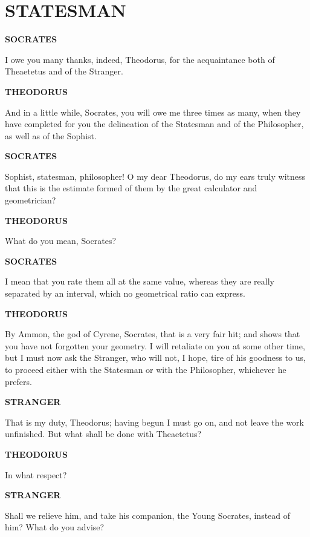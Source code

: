 \documentclass[11pt,letter]{article}
\begin{document}
\par 
\section{
      STATESMAN
    } 
\par \textbf{SOCRATES}
\par   I owe you many thanks, indeed, Theodorus, for the acquaintance both of Theaetetus and of the Stranger.

\par \textbf{THEODORUS}
\par   And in a little while, Socrates, you will owe me three times as many, when they have completed for you the delineation of the Statesman and of the Philosopher, as well as of the Sophist.

\par \textbf{SOCRATES}
\par   Sophist, statesman, philosopher! O my dear Theodorus, do my ears truly witness that this is the estimate formed of them by the great calculator and geometrician?

\par \textbf{THEODORUS}
\par   What do you mean, Socrates?

\par \textbf{SOCRATES}
\par   I mean that you rate them all at the same value, whereas they are really separated by an interval, which no geometrical ratio can express.

\par \textbf{THEODORUS}
\par   By Ammon, the god of Cyrene, Socrates, that is a very fair hit; and shows that you have not forgotten your geometry. I will retaliate on you at some other time, but I must now ask the Stranger, who will not, I hope, tire of his goodness to us, to proceed either with the Statesman or with the Philosopher, whichever he prefers.

\par \textbf{STRANGER}
\par   That is my duty, Theodorus; having begun I must go on, and not leave the work unfinished. But what shall be done with Theaetetus?

\par \textbf{THEODORUS}
\par   In what respect?

\par \textbf{STRANGER}
\par   Shall we relieve him, and take his companion, the Young Socrates, instead of him? What do you advise?
\end{document}
